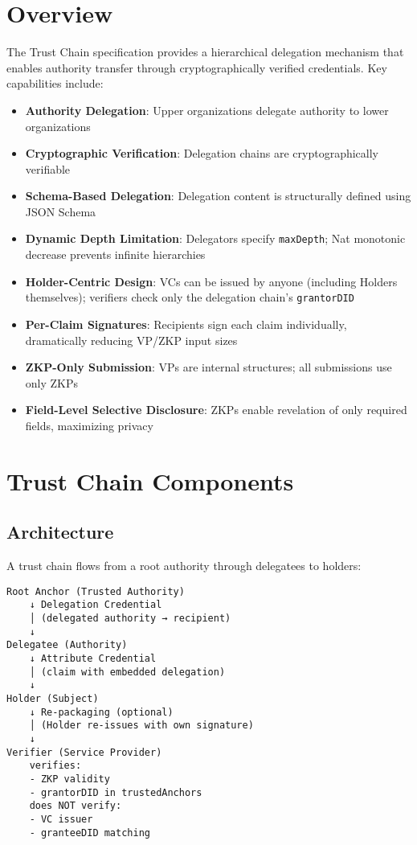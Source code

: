 \section{Overview}

The Trust Chain specification provides a hierarchical delegation mechanism that enables authority transfer through cryptographically verified credentials. Key capabilities include:

\begin{itemize}
  \item \textbf{Authority Delegation}: Upper organizations delegate authority to lower organizations
  \item \textbf{Cryptographic Verification}: Delegation chains are cryptographically verifiable
  \item \textbf{Schema-Based Delegation}: Delegation content is structurally defined using JSON Schema
  \item \textbf{Dynamic Depth Limitation}: Delegators specify \texttt{maxDepth}; Nat monotonic decrease prevents infinite hierarchies
  \item \textbf{Holder-Centric Design}: VCs can be issued by anyone (including Holders themselves); verifiers check only the delegation chain's \texttt{grantorDID}
  \item \textbf{Per-Claim Signatures}: Recipients sign each claim individually, dramatically reducing VP/ZKP input sizes
  \item \textbf{ZKP-Only Submission}: VPs are internal structures; all submissions use only ZKPs
  \item \textbf{Field-Level Selective Disclosure}: ZKPs enable revelation of only required fields, maximizing privacy
\end{itemize}

\section{Trust Chain Components}

\subsection{Architecture}

A trust chain flows from a root authority through delegatees to holders:

\begin{center}
\begin{verbatim}
Root Anchor (Trusted Authority)
    ↓ Delegation Credential
    │ (delegated authority → recipient)
    ↓
Delegatee (Authority)
    ↓ Attribute Credential
    │ (claim with embedded delegation)
    ↓
Holder (Subject)
    ↓ Re-packaging (optional)
    │ (Holder re-issues with own signature)
    ↓
Verifier (Service Provider)
    verifies:
    - ZKP validity
    - grantorDID in trustedAnchors
    does NOT verify:
    - VC issuer
    - granteeDID matching
\end{verbatim}
\end{center}

